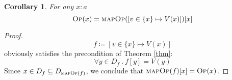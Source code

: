 \documentclass{article}
\newtheorem{corollary}[theorem]{Corollary}
\newcommand{\op}{\textsc{Op}}
\newcommand{\mop}{\textsc{mapOp}}
\begin{document}
\begin{corollary}
For any $x\colon a$
\[
\op(x) = \mop([ v \in \{x\} \mapsto V(x) ])[x]
\]
\end{corollary}
\begin{proof}
\[
f \coloneqq [ v \in \{x\} \mapsto V(x) ]
\]
obviously satisfies the precondition of Theorem \ref{thm}:
\[
\forall y \in D_f \ .\ f[y] = V(y)
\]
Since $x \in D_f \subseteq D_{\mop(f)}$, we conclude that $\mop(f)[x] = \op(x)$.
\end{proof}
\end{document}
